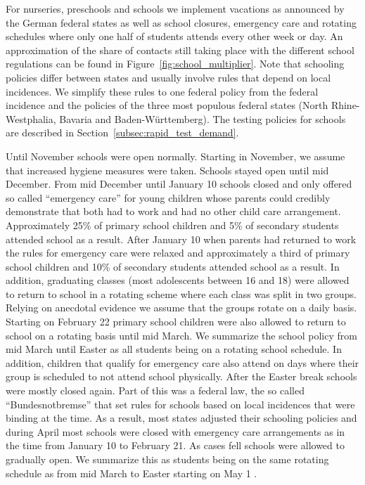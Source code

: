 
For nurseries, preschools and schools we implement vacations as announced by the German
federal states as well as school closures, emergency care and rotating schedules where
only one half of students attends every other week or day. An approximation of the share
of contacts still taking place with the different school regulations can be found in
Figure~\ref{fig:school_multiplier}. Note that schooling policies differ between states
and usually involve rules that depend on local incidences. We simplify these rules to one
federal policy from the federal incidence and the policies of the three most populous
federal states (North Rhine-Westphalia, Bavaria and Baden-Württemberg). The testing
policies for schools are described in Section~\ref{subsec:rapid_test_demand}.

Until November schools were open normally. Starting in November, we assume that increased
hygiene measures were taken. Schools stayed open until mid December.
From mid December until January 10 schools closed and only offered so called ``emergency
care'' for young children whose parents could credibly demonstrate that both had to work
and had no other child care arrangement. Approximately 25\% of primary school children and 5\%
of secondary students attended school as a result.
After January 10 when parents had returned to work the rules for emergency care were
relaxed and approximately a third of primary school children and 10\% of secondary students
attended school as a result. In addition, graduating classes (most adolescents between 16
and 18) were allowed to return to school in a rotating scheme where each class was split
in two groups. Relying on anecdotal evidence we assume that the groups rotate on a daily
basis.%
Starting on February 22 primary school children were also allowed to return to school on
a rotating basis until mid March.
We summarize the school policy from mid March until Easter as all students being on a
rotating school schedule. In addition, children that qualify for emergency care also
attend on days where their group is scheduled to not attend school physically.
After the Easter break schools were mostly closed again. Part of this was a federal law,
the so called ``Bundesnotbremse'' \citep{Notbremse2021} that set rules for schools based
on local incidences that were binding at the time. As a result, most states adjusted
their schooling policies and during April most schools were closed with emergency care
arrangements as in the time from January 10 to February 21. As cases fell schools were
allowed to gradually open. We summarize this as students being on the same rotating
schedule as from mid March to Easter starting on May 1 \citep{schoolBW, schoolBWa,
schoolBWb, schoolBY, schoolBYa, schoolNRW, schoolNRWa, schoolNRWb, schoolNRWc}.

